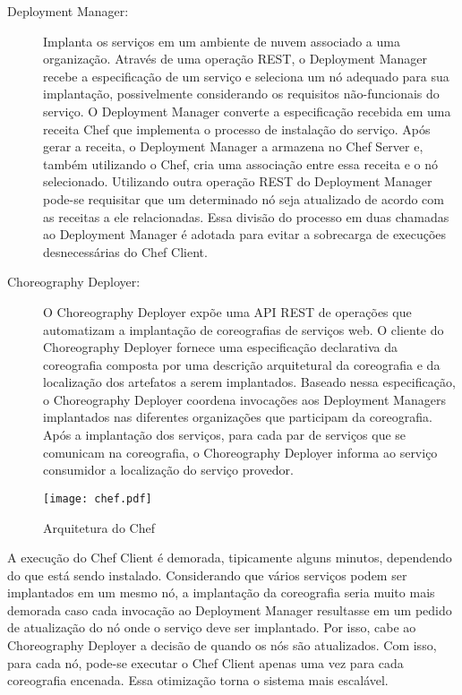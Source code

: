 \begin{description}
\item [Deployment Manager:]

Implanta os serviços em um ambiente de nuvem associado a uma organização. Através de uma operação REST, o Deployment Manager recebe a especificação de um serviço e seleciona um nó adequado para sua implantação, possivelmente considerando os requisitos não-funcionais do serviço. O Deployment Manager converte a especificação recebida em uma receita Chef que implementa o processo de instalação do serviço. Após gerar a receita, o Deployment Manager a armazena no Chef Server e, também utilizando o Chef, cria uma associação entre essa receita e o nó selecionado. Utilizando outra operação REST do Deployment Manager pode-se requisitar que um determinado nó seja atualizado de acordo com as receitas a ele relacionadas. Essa divisão do processo em duas chamadas ao Deployment Manager é adotada para evitar a sobrecarga de execuções desnecessárias do Chef Client.

\item [Choreography Deployer:]

O Choreography Deployer expõe uma API REST de operações que automatizam a implantação de coreografias de serviços web. O cliente do Choreography Deployer fornece uma especificação declarativa da coreografia composta por uma descrição arquitetural da coreografia e da localização dos artefatos a serem implantados. Baseado nessa especificação, o Choreography Deployer coordena invocações aos Deployment Managers implantados nas diferentes organizações que participam da coreografia. Após a implantação dos serviços, para cada par de serviços que se comunicam na coreografia, o Choreography Deployer informa ao serviço consumidor a localização do serviço provedor.

\end{description}

\begin{figure}[!h]
  \centering
  \texttt{[image: chef.pdf]} 
  \caption{Arquitetura do Chef}
  \label{fig:chef_arquitetura} 
\end{figure}

A execução do Chef Client é demorada, tipicamente alguns minutos, dependendo do que está sendo instalado. Considerando que vários serviços podem ser implantados em um mesmo nó, a implantação da coreografia seria muito mais demorada caso cada invocação ao Deployment Manager resultasse em um pedido de atualização do nó onde o serviço deve ser implantado. Por isso, cabe ao Choreography Deployer a decisão de quando os nós são atualizados. Com isso, para cada nó, pode-se executar o Chef Client apenas uma vez para cada coreografia encenada. Essa otimização torna o sistema mais escalável. 

